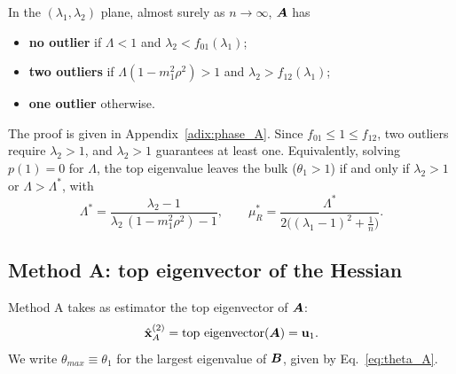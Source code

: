 \begin{prop}\label{prop:phase_A}
In the $(\lambda_1, \lambda_2)$ plane, almost surely as $n\to\infty$, $\bm{A}$ has
\begin{itemize}
    \item \textbf{no outlier} if $\Lambda < 1$ and $\lambda_2 < f_{01}(\lambda_1)$;
    \item \textbf{two outliers} if $\Lambda(1-m_1^2\rho^2) > 1$ and $\lambda_2 > f_{12}(\lambda_1)$;
    \item \textbf{one outlier} otherwise.
\end{itemize}
\end{prop}
\noindent
The proof is given in Appendix~\ref{adix:phase_A}. Since $f_{01} \le 1 \le f_{12}$, two outliers require $\lambda_2 > 1$, and $\lambda_2 > 1$ guarantees at least one. Equivalently, solving $p(1) = 0$ for $\Lambda$, the top eigenvalue leaves the bulk ($\theta_1 > 1$) if and only if $\lambda_2 > 1$ or $\Lambda > \Lambda^*$, with
\begin{equation}
    \Lambda^* = \frac{\lambda_2 - 1}{\lambda_2\,(1-m_1^2\rho^2) - 1},
    \qquad
    \mu_R^* = \frac{\Lambda^*}{2\big((\lambda_1-1)^2 + \frac1n\big)} .
    \label{eq:Lambda_star}
\end{equation}

\subsection{Method A: top eigenvector of the Hessian}\label{sec:methodA}
Method A takes as estimator the top eigenvector of $\bm{A}$:
\begin{equation}
    \hat{\boldsymbol{\mathbf{x}}}^{(2)}_{A} = \text{top eigenvector}(\bm{A}) = \boldsymbol{\mathbf{u}}_1 .
    \label{eq:x_hat_a}
\end{equation}
We write $\theta_{max} \equiv \theta_1$ for the largest eigenvalue of $\bm{B}$, given by Eq.~\eqref{eq:theta_A}.

